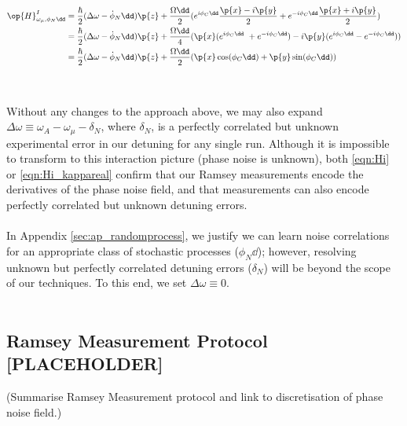 \begin{align}
\op{H}^{I}_{\omega_\mu,\phi_N\dd} & = \frac{\hbar}{2}(\Delta\omega - \dot{\phi}_N\dd)\p{z} + \frac{\Omega\dd}{2} (e^{i\phi_C\dd}\frac{\p{x} - i\p{y}}{2} + e^{-i\phi_C\dd}\frac{\p{x} + i\p{y}}{2})\\
& = \frac{\hbar}{2}(\Delta\omega - \dot{\phi}_N\dd)\p{z} + \frac{\Omega\dd}{4} (\p{x} (e^{i\phi_C\dd}\ +  e^{-i\phi_C\dd})- i\p{y} ( e^{i\phi_C\dd} - e^{-i\phi_C\dd} ))\\
& = \frac{\hbar}{2}(\Delta\omega - \dot{\phi}_N\dd)\p{z} + \frac{\Omega\dd}{2} (\p{x} \cos(\phi_C\dd) + \p{y} \sin(\phi_C\dd)) \label{eqn:Hi_kappareal}
\end{align}
\\
\\
Without any changes to the approach above, we may also expand $\Delta \omega \equiv \omega_A -\omega_\mu -\delta_N$, where $\delta_N$, is a perfectly correlated but unknown experimental error in our detuning for any single run. Although it is impossible to transform to this interaction picture (phase noise is unknown), both \ref{eqn:Hi} or \ref{eqn:Hi_kappareal} confirm that our Ramsey measurements encode the derivatives of the phase noise field, and that measurements can also encode perfectly correlated but unknown detuning errors.
\\
\\
In Appendix \ref{sec:ap_randomprocess}, we justify we can learn noise correlations for an appropriate class of stochastic processes ($\phi_N\dd$); however, resolving unknown but perfectly correlated detuning errors ($\delta_N$) will be beyond the scope of our techniques. To this end, we set $\Delta \omega \equiv 0$.
\\
\\
\subsection{Ramsey Measurement Protocol [PLACEHOLDER]}

(Summarise Ramsey Measurement protocol and link to discretisation of phase noise field.)